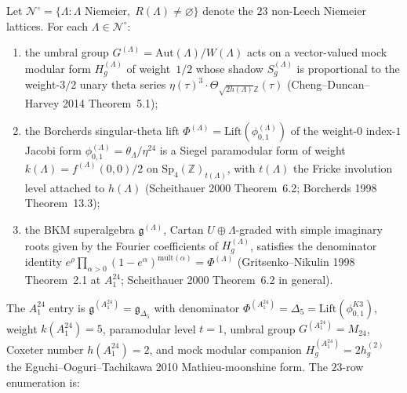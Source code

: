 \begin{theorem}[The umbral BKM enumeration, \texorpdfstring{$A_1^{24}$}{A-1-24} entry \texorpdfstring{$=\Delta_5$}{=Delta-5}]
\label{thm:k3ca-umbral-bkm-census-23}
Let $\mathscr N^\circ=\{\Lambda:\Lambda\text{ Niemeier},\;R(\Lambda)\neq\varnothing\}$
denote the $23$ non-Leech Niemeier lattices. For each
$\Lambda\in\mathscr N^\circ$:
\begin{enumerate}
 \item the umbral group $G^{(\Lambda)}=\mathrm{Aut}(\Lambda)/W(\Lambda)$
 acts on a vector-valued mock modular form $H^{(\Lambda)}_g$
 of weight~$1/2$ whose shadow $S^{(\Lambda)}_g$ is
 proportional to the weight-$3/2$ unary theta series
 $\eta(\tau)^3\cdot\Theta_{\sqrt{2h(\Lambda)}\mathbb Z}(\tau)$
 (Cheng--Duncan--Harvey 2014 Theorem~5.1);
 \item the Borcherds singular-theta lift
 $\Phi^{(\Lambda)}=\mathrm{Lift}(\phi^{(\Lambda)}_{0,1})$ of the
 weight-$0$ index-$1$ Jacobi form
 $\phi^{(\Lambda)}_{0,1}=\theta_\Lambda/\eta^{24}$ is a
 Siegel paramodular form of weight $k(\Lambda)=f^{(\Lambda)}(0,0)/2$
 on $\mathrm{Sp}_4(\mathbb Z)_{t(\Lambda)}$, with $t(\Lambda)$ the
 Fricke involution level attached to $h(\Lambda)$
 (Scheithauer 2000 Theorem~6.2; Borcherds 1998 Theorem~13.3);
 \item the BKM superalgebra $\mathfrak g^{(\Lambda)}$, Cartan
 $U\oplus\Lambda$-graded with simple imaginary roots given
 by the Fourier coefficients of $H^{(\Lambda)}_g$, satisfies
 the denominator identity $e^\rho\prod_{\alpha>0}(1-e^\alpha)^{\mathrm{mult}(\alpha)}
 =\Phi^{(\Lambda)}$ (Gritsenko--Nikulin 1998 Theorem~2.1 at
 $A_1^{24}$; Scheithauer 2000 Theorem~6.2 in general).
\end{enumerate}
The $A_1^{24}$ entry is $\mathfrak g^{(A_1^{24})}=\mathfrak g_{\Delta_5}$
with denominator $\Phi^{(A_1^{24})}=\Delta_5=\mathrm{Lift}(\phi_{0,1}^{K3})$,
weight $k(A_1^{24})=5$, paramodular level $t=1$, umbral group
$G^{(A_1^{24})}=M_{24}$, Coxeter number $h(A_1^{24})=2$, and mock
modular companion $H^{(A_1^{24})}_g=2h^{(2)}_g$ the
Eguchi--Ooguri--Tachikawa 2010 Mathieu-moonshine form. The
$23$-row enumeration is:


\end{theorem}
